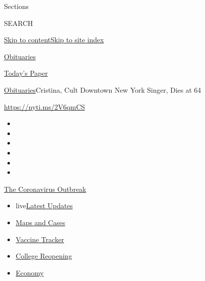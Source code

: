 Sections

SEARCH

\protect\hyperlink{site-content}{Skip to
content}\protect\hyperlink{site-index}{Skip to site index}

\href{https://www.nytimes.com/section/obituaries}{Obituaries}

\href{https://myaccount.nytimes.com/auth/login?response_type=cookie\&client_id=vi}{}

\href{https://www.nytimes.com/section/todayspaper}{Today's Paper}

\href{/section/obituaries}{Obituaries}\textbar{}Cristina, Cult Downtown
New York Singer, Dies at 64

\url{https://nyti.ms/2V6qmCS}

\begin{itemize}
\item
\item
\item
\item
\item
\item
\end{itemize}

\href{https://www.nytimes.com/news-event/coronavirus?action=click\&pgtype=Article\&state=default\&region=TOP_BANNER\&context=storylines_menu}{The
Coronavirus Outbreak}

\begin{itemize}
\tightlist
\item
  live\href{https://www.nytimes.com/2020/08/03/world/coronavirus-covid-19.html?action=click\&pgtype=Article\&state=default\&region=TOP_BANNER\&context=storylines_menu}{Latest
  Updates}
\item
  \href{https://www.nytimes.com/interactive/2020/us/coronavirus-us-cases.html?action=click\&pgtype=Article\&state=default\&region=TOP_BANNER\&context=storylines_menu}{Maps
  and Cases}
\item
  \href{https://www.nytimes.com/interactive/2020/science/coronavirus-vaccine-tracker.html?action=click\&pgtype=Article\&state=default\&region=TOP_BANNER\&context=storylines_menu}{Vaccine
  Tracker}
\item
  \href{https://www.nytimes.com/2020/08/02/us/covid-college-reopening.html?action=click\&pgtype=Article\&state=default\&region=TOP_BANNER\&context=storylines_menu}{College
  Reopening}
\item
  \href{https://www.nytimes.com/live/2020/08/03/business/stock-market-today-coronavirus?action=click\&pgtype=Article\&state=default\&region=TOP_BANNER\&context=storylines_menu}{Economy}
\end{itemize}

